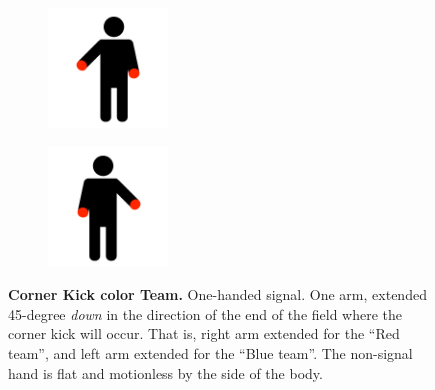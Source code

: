         \begin{figure}[ht!]
            \centering
            \begin{subfigure}{.33\textwidth}
                \includegraphics[height=120px]{figs/referee-signals/corner-kick.png}
            \end{subfigure}
            \begin{subfigure}{.33\textwidth}
                \includegraphics[height=120px]{figs/referee-signals/corner-kick-flipped.png}
            \end{subfigure}
            \caption{\textbf{Corner Kick \textlangle{}color\textrangle{} Team.}
            One-handed signal. One arm, extended 45-degree \emph{down} in the direction of the end of the field where the corner kick will occur. That is, right arm extended for the ``Red team'', and left arm extended for the ``Blue team''. The non-signal hand is flat and motionless by the side of the body.}
        \end{figure}
            
